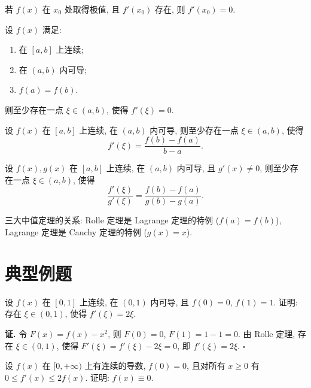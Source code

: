 \documentclass[a4paper,12pt,oneside]{maki-notes}
\begin{document}
	\begin{lemma}[Fermat 引理]
		若 $f(x)$ 在 $x_0$ 处取得极值, 且 $f'(x_0)$ 存在, 则 $f'(x_0) = 0$.
	\end{lemma}
	
	\begin{theorem}
		设 $f(x)$ 满足:
		\begin{enumerate}
			\item 在 $[a, b]$ 上连续;
			\item 在 $(a, b)$ 内可导;
			\item $f(a) = f(b)$.
		\end{enumerate}
		则至少存在一点 $\xi \in (a, b)$, 使得 $f'(\xi) = 0$.
	\end{theorem}
	
	\begin{theorem}
		设 $f(x)$ 在 $[a, b]$ 上连续, 在 $(a, b)$ 内可导, 则至少存在一点 $\xi \in (a, b)$, 使得
		\[
		f'(\xi) = \dfrac{f(b) - f(a)}{b - a}.
		\]
	\end{theorem}
	
	\begin{theorem}
		设 $f(x), g(x)$ 在 $[a, b]$ 上连续, 在 $(a, b)$ 内可导, 且 $g'(x) \neq 0$, 则至少存在一点 $\xi \in (a, b)$, 使得
		\[
		\dfrac{f'(\xi)}{g'(\xi)} = \dfrac{f(b) - f(a)}{g(b) - g(a)}.
		\]
	\end{theorem}
	
	\begin{note}
		三大中值定理的关系: Rolle 定理是 Lagrange 定理的特例 ($f(a) = f(b)$), Lagrange 定理是 Cauchy 定理的特例 ($g(x) = x$).
	\end{note}
	
	\section{典型例题}
	
	\begin{example}
		设 $f(x)$ 在 $[0, 1]$ 上连续, 在 $(0, 1)$ 内可导, 且 $f(0) = 0$, $f(1) = 1$. 证明: 存在 $\xi \in (0, 1)$, 使得 $f'(\xi) = 2\xi$.
	\end{example}
	
	\textbf{证.} 令 $F(x) = f(x) - x^2$, 则 $F(0) = 0$, $F(1) = 1 - 1 = 0$. 由 Rolle 定理, 存在 $\xi \in (0, 1)$, 使得 $F'(\xi) = f'(\xi) - 2\xi = 0$, 即 $f'(\xi) = 2\xi$. \hfill $\square$
	
	\begin{realexam}[2019 数学一]
		设 $f(x)$ 在 $[0, +\infty)$ 上有连续的导数, $f(0) = 0$, 且对所有 $x \ge 0$ 有 $0 \le f'(x) \le 2f(x)$. 证明: $f(x) \equiv 0$.
	\end{realexam}
	
\end{document}
